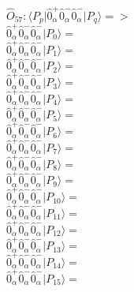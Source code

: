 \documentclass[14pt]{article}
\begin{document}
    $\hat{O}_{57}:  \langle{P_p}\vert \hat{0}_{\alpha}^{+}\hat{0}_{\alpha}^{-}\hat{0}_{\alpha}^{-} \vert{P_q}\rangle => $ \\ 
    $ \hat{0}_{\alpha}^{+}\hat{0}_{\alpha}^{-}\hat{0}_{\alpha}^{-} \vert{P_{0}}\rangle =  $ \\ 
    $ \hat{0}_{\alpha}^{+}\hat{0}_{\alpha}^{-}\hat{0}_{\alpha}^{-} \vert{P_{1}}\rangle =  $ \\ 
    $ \hat{0}_{\alpha}^{+}\hat{0}_{\alpha}^{-}\hat{0}_{\alpha}^{-} \vert{P_{2}}\rangle =  $ \\ 
    $ \hat{0}_{\alpha}^{+}\hat{0}_{\alpha}^{-}\hat{0}_{\alpha}^{-} \vert{P_{3}}\rangle =  $ \\ 
    $ \hat{0}_{\alpha}^{+}\hat{0}_{\alpha}^{-}\hat{0}_{\alpha}^{-} \vert{P_{4}}\rangle =  $ \\ 
    $ \hat{0}_{\alpha}^{+}\hat{0}_{\alpha}^{-}\hat{0}_{\alpha}^{-} \vert{P_{5}}\rangle =  $ \\ 
    $ \hat{0}_{\alpha}^{+}\hat{0}_{\alpha}^{-}\hat{0}_{\alpha}^{-} \vert{P_{6}}\rangle =  $ \\ 
    $ \hat{0}_{\alpha}^{+}\hat{0}_{\alpha}^{-}\hat{0}_{\alpha}^{-} \vert{P_{7}}\rangle =  $ \\ 
    $ \hat{0}_{\alpha}^{+}\hat{0}_{\alpha}^{-}\hat{0}_{\alpha}^{-} \vert{P_{8}}\rangle =  $ \\ 
    $ \hat{0}_{\alpha}^{+}\hat{0}_{\alpha}^{-}\hat{0}_{\alpha}^{-} \vert{P_{9}}\rangle =  $ \\ 
    $ \hat{0}_{\alpha}^{+}\hat{0}_{\alpha}^{-}\hat{0}_{\alpha}^{-} \vert{P_{10}}\rangle =  $ \\ 
    $ \hat{0}_{\alpha}^{+}\hat{0}_{\alpha}^{-}\hat{0}_{\alpha}^{-} \vert{P_{11}}\rangle =  $ \\ 
    $ \hat{0}_{\alpha}^{+}\hat{0}_{\alpha}^{-}\hat{0}_{\alpha}^{-} \vert{P_{12}}\rangle =  $ \\ 
    $ \hat{0}_{\alpha}^{+}\hat{0}_{\alpha}^{-}\hat{0}_{\alpha}^{-} \vert{P_{13}}\rangle =  $ \\ 
    $ \hat{0}_{\alpha}^{+}\hat{0}_{\alpha}^{-}\hat{0}_{\alpha}^{-} \vert{P_{14}}\rangle =  $ \\ 
    $ \hat{0}_{\alpha}^{+}\hat{0}_{\alpha}^{-}\hat{0}_{\alpha}^{-} \vert{P_{15}}\rangle =  $ \\ 
    
\end{document}
